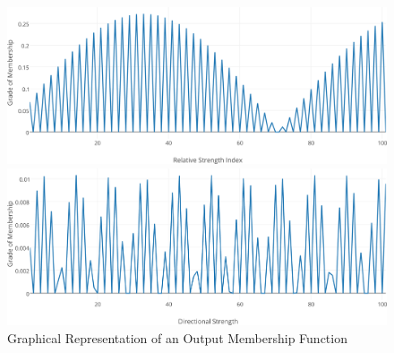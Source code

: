 \documentclass[a4paper,twoside]{article}
\begin{document}
\begin{figure}[h!]
\begin{center}
\includegraphics[width=1.00\columnwidth]{figures/mf-input/mf-input}
\caption{{\label{input-mf}Graphical Representation of an Input Membership Function%
}}
\includegraphics[width=1.00\columnwidth]{figures/mf-output/mf-output}
\caption{{\label{output-mf}Graphical Representation of an Output Membership Function%
}}
\end{center}
\end{figure}
\end{document}
